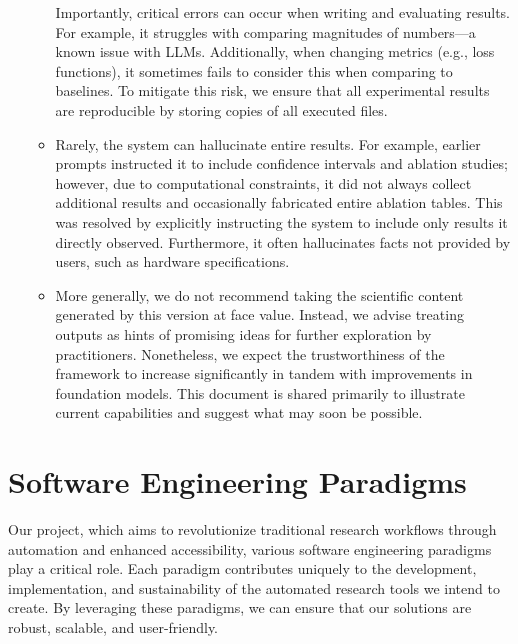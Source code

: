 \begin{enumerate}
\begin{itemize}
        Importantly, critical errors can occur when writing and evaluating results. For example, it struggles with comparing magnitudes of numbers—a known issue with LLMs. Additionally, when changing metrics (e.g., loss functions), it sometimes fails to consider this when comparing to baselines. To mitigate this risk, we ensure that all experimental results are reproducible by storing copies of all executed files.
        \item 

        Rarely, the system can hallucinate entire results. For example, earlier prompts instructed it to include confidence intervals and ablation studies; however, due to computational constraints, it did not always collect additional results and occasionally fabricated entire ablation tables. This was resolved by explicitly instructing the system to include only results it directly observed. Furthermore, it often hallucinates facts not provided by users, such as hardware specifications.
        \item 
        
        More generally, we do not recommend taking the scientific content generated by this version at face value. Instead, we advise treating outputs as hints of promising ideas for further exploration by practitioners. Nonetheless, we expect the trustworthiness of the framework to increase significantly in tandem with improvements in foundation models. This document is shared primarily to illustrate current capabilities and suggest what may soon be possible. 
    \end{itemize}
\end{enumerate}

\section{Software Engineering Paradigms}

Our project, which aims to revolutionize traditional research workflows through automation and enhanced accessibility, various software engineering paradigms play a critical role. Each paradigm contributes uniquely to the development, implementation, and sustainability of the automated research tools we intend to create. By leveraging these paradigms, we can ensure that our solutions are robust, scalable, and user-friendly.

